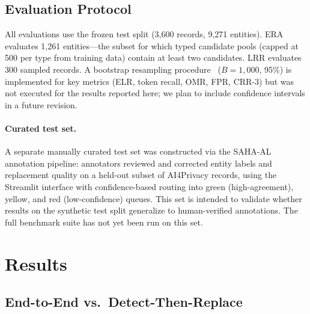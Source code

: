 \documentclass[10pt,twocolumn]{article}
\begin{document}
\subsection{Evaluation Protocol}

All evaluations use the frozen test split (3{,}600 records, 9{,}271 entities).
ERA evaluates 1{,}261 entities---the subset for which typed candidate pools (capped at 500 per type from training data) contain at least two candidates.
LRR evaluates 300 sampled records.
A bootstrap resampling procedure~\citep{efron1993} ($B\!=\!1{,}000$, 95\%) is implemented for key metrics (ELR, token recall, OMR, FPR, CRR-3) but was not executed for the results reported here; we plan to include confidence intervals in a future revision.

\paragraph{Curated test set.}
A separate manually curated test set was constructed via the SAHA-AL annotation pipeline: annotators reviewed and corrected entity labels and replacement quality on a held-out subset of AI4Privacy records, using the Streamlit interface with confidence-based routing into green (high-agreement), yellow, and red (low-confidence) queues.
This set is intended to validate whether results on the synthetic test split generalize to human-verified annotations.
The full benchmark suite has not yet been run on this set.

\section{Results}\label{sec:results}

\subsection{End-to-End vs.\ Detect-Then-Replace}\label{sec:res-main}
\end{document}
